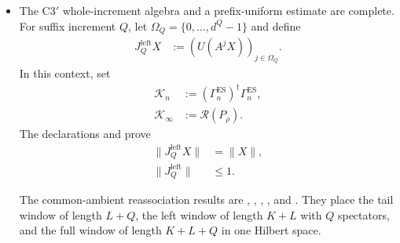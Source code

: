 \documentclass{article}
\providecommand{\Fin}[1]{\{0,\ldots,#1{-}1\}}
\begin{document}
\begin{itemize}
    \item The C3$'$ whole-increment algebra and a prefix-uniform estimate are
          complete. For suffix increment $Q$, let
          $\Omega_Q=\Fin{d^Q}$ and define
          \begin{align}
              J_Q^{\mathrm{left}}X
               & :=
              (U(A^jX))_{j\in\Omega_Q}.
              \label{eq:cpgsv21_martingale_overlap_left_virtual_map}
          \end{align}
          In this context, set
          \begin{align}
              \mathcal K_n
               & :=
              (\Gamma_n^{\mathrm{ES}})^\dagger\Gamma_n^{\mathrm{ES}},
              \label{eq:cpgsv21_martingale_overlap_whole_increment_finite_gram} \\
              \mathcal K_\infty
               & :=
              \mathscr R(P_\rho).
              \label{eq:cpgsv21_martingale_overlap_whole_increment_limiting_gram}
          \end{align}
          The declarations
           and
           prove
          \begin{align}
              \lVert J_Q^{\mathrm{left}}X\rVert
               & =\lVert X\rVert,
              \label{eq:cpgsv21_martingale_overlap_left_virtual_isometry} \\
              \lVert J_Q^{\mathrm{left}}\rVert
               & \leq1.
              \label{eq:cpgsv21_martingale_overlap_left_virtual_norm}
          \end{align}

          The common-ambient reassociation results are
          ,
          ,
          ,
          , and
          .
          They place the tail window of length $L+Q$, the left window of length
          $K+L$ with $Q$ spectators, and the full window of length $K+L+Q$ in one
          Hilbert space.


\end{itemize}
\end{document}
